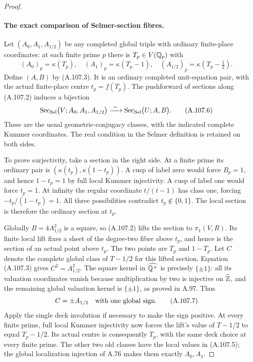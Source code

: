 \begin{proof}
\paragraph{The exact comparison of Selmer-section fibres.}
Let $(A_0,A_1,A_{1/2})$ be any completed global triple
with ordinary finite-place coordinates: at each finite
prime $p$ there is $T_p\in V(\mathbb Q_p)$ with
\[
 (A_0)_p=\kappa(T_p),\quad
 (A_1)_p=\kappa(T_p-1),\quad
 (A_{1/2})_p=\kappa(T_p-\tfrac12).
 \tag{A.107.5}
\]
Define $(A,B)$ by (A.107.3).
It is an ordinary completed unit-equation pair, with
the actual finite-place centre $t_p=f(T_p)$.
The pushforward of sections along (A.107.2) induces a
bijection
\[
 \operatorname{Sec}_{\rm Sel}
       \bigl(V;A_0,A_1,A_{1/2}\bigr)
       \xrightarrow{\ \sim\ }
 \operatorname{Sec}_{\rm Sel}\bigl(U;A,B\bigr).
 \tag{A.107.6}
\]
These are the usual geometric-conjugacy classes, with
the indicated complete Kummer coordinates.  The real
condition in the Selmer definition is retained on both sides.

To prove surjectivity, take a section in the right
side.  At a finite prime its ordinary pair is
$(\kappa(t_p),\kappa(1-t_p))$.
A cusp of label zero would force $B_p=1$, and hence
$1-t_p=1$ by full local Kummer injectivity.
A cusp of label one would force $t_p=1$.
At infinity the regular coordinate $t/(t-1)$ has
class one, forcing $-t_p/(1-t_p)=1$.
All three possibilities contradict $t_p\notin\{0,1\}$.
The local section is therefore the ordinary section
at $t_p$.

Globally $B=4A_{1/2}^2$ is a square, so (A.107.2) lifts
the section to $\pi_1(V,R)$.
Its finite local lift fixes a sheet of the degree-two
fibre above $t_p$, and hence is the section of an
actual point above $t_p$.  The two points are
$T_p$ and $1-T_p$.
Let $C$ denote the complete global class of
$T-1/2$ for this lifted section.
Equation (A.107.3) gives $C^2=A_{1/2}^2$.
The square kernel in $\widehat{\mathbb Q^\times}$ is
precisely $\{\pm1\}$: all its valuation coordinates
vanish because multiplication by two is injective
on $\widehat{\mathbb Z}$, and the remaining global valuation
kernel is $\{\pm1\}$, as proved in A.97.
Thus
\[
                              C=\pm A_{1/2}
                  \quad\hbox{with one global sign}.
 \tag{A.107.7}
\]
Apply the single deck involution if necessary to
make the sign positive.
At every finite prime, full local Kummer injectivity
now forces the lift's value of $T-1/2$ to equal
$T_p-1/2$.  Its actual centre is consequently $T_p$,
with the same deck choice at every finite prime.
The other two old classes have the local values
in (A.107.5); the global localization injection of A.76
makes them exactly $A_0,A_1$.


\end{proof}
